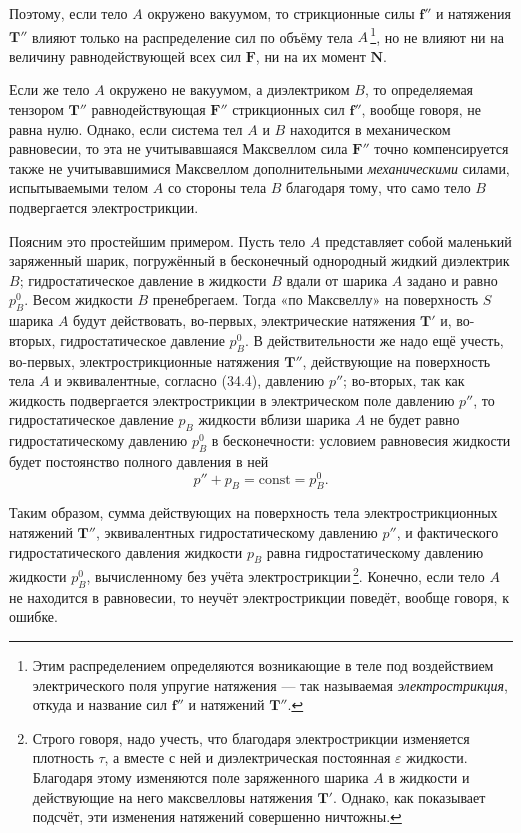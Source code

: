 \documentclass[a4paper,10pt]{article}
\begin{document}
Поэтому, если тело $A$ окружено вакуумом, то стрикционные силы
$\mathbf{f}''$ и натяжения $\mathbf{T}''$ влияют только на распределение
сил по объёму тела $A$\,\footnote{Этим распределением определяются
возникающие в теле под воздействием электрического поля упругие
натяжения — так называемая \textit{электрострикция}, откуда и название
сил $\mathbf{f}''$ и натяжений $\mathbf{T}''$.}, но не влияют ни на
величину равнодействующей всех сил $\mathbf{F}$, ни на их момент
$\mathbf{N}$.

Если же тело $A$ окружено не вакуумом, а диэлектриком $B$, то
определяемая тензором $\mathbf{T}''$ равнодействующая $\mathbf{F}''$
стрикционных сил $\mathbf{f}''$, вообще говоря, не равна нулю. Однако,
если система тел $A$ и $B$ находится в механическом равновесии, то эта
не учитывавшаяся Максвеллом сила $\mathbf{F}''$ точно компенсируется
также не учитывавшимися Максвеллом дополнительными \textit{механическими}
силами, испытываемыми телом $A$ со стороны тела $B$ благодаря
тому, что само тело $B$ подвергается электрострикции.

Поясним это простейшим примером. Пусть тело $A$ представляет
собой маленький заряженный шарик, погружённый в бесконечный
однородный жидкий диэлектрик $B$; гидростатическое давление
в жидкости $B$ вдали от шарика $A$ задано и равно $p_B^0$. Весом
жидкости $B$ пренебрегаем. Тогда «по Максвеллу» на поверхность
$S$ шарика $A$ будут действовать, во-первых, электрические натяжения
$\mathbf{T}'$ и, во-вторых, гидростатическое давление $p_B^0$.
В действительности же надо ещё учесть, во-первых, электрострикционные
натяжения $\mathbf{T}''$, действующие на поверхность тела $A$
и эквивалентные, согласно (34.4), давлению $p''$; во-вторых, так
как жидкость подвергается электрострикции в электрическом поле
давлению $p''$, то гидростатическое давление $p_B$ жидкости вблизи
шарика $A$ не будет равно гидростатическому давлению $p_B^0$
в бесконечности: условием равновесия жидкости будет постоянство
полного давления в ней
$$
    p'' + p_B = \mathrm{const} = p_B^0.
$$

Таким образом, сумма действующих на поверхность тела электрострикционных
натяжений $\mathbf{T}''$, эквивалентных гидростатическому давлению
$p''$, и фактического гидростатического давления жидкости $p_B$ равна
гидростатическому давлению жидкости $p_B^0$, вычисленному без учёта
электрострикции\,\footnote{Строго говоря, надо учесть, что благодаря
электрострикции изменяется плотность $\tau$, а вместе с ней и
диэлектрическая постоянная $\varepsilon$ жидкости. Благодаря этому
изменяются поле заряженного шарика $A$ в жидкости и действующие на него
максвелловы натяжения $\mathbf{T}'$. Однако, как показывает подсчёт,
эти изменения натяжений совершенно ничтожны.}. Конечно, если тело $A$
не находится в равновесии, то неучёт электрострикции поведёт, вообще
говоря, к ошибке.
\end{document}
